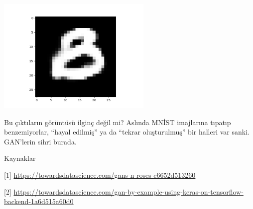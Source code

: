 \documentclass[12pt,fleqn]{article}\usepackage{../../common}
\begin{document}
\includegraphics[width=20em]{gan_03.png}

Bu çıktıların görüntüsü ilginç değil mi? Aslında MNİST imajlarına tıpatıp
benzemiyorlar, ``hayal edilmiş'' ya da ``tekrar oluşturulmuş'' bir halleri
var sanki. GAN'lerin sihri burada. 

Kaynaklar

[1] \url{https://towardsdatascience.com/gans-n-roses-c6652d513260}

[2] \url{https://towardsdatascience.com/gan-by-example-using-keras-on-tensorflow-backend-1a6d515a60d0}
\end{document}
